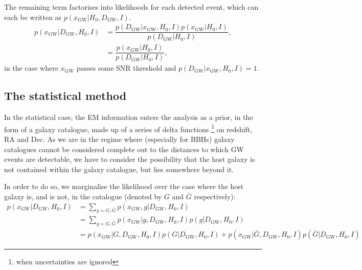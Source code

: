 \documentclass[a4paper,10pt]{article}
\begin{document}
The remaining term factorises into likelihoods for each detected event,
which can each be written as $p(x_{\text{GW}}|H_0,D_{\text{GW}},I)$.
\begin{equation}
\label{Eq.xD}
\begin{aligned}
p(x_{\text{GW}}|D_{\text{GW}},H_0,I) &= \dfrac{p(D_{\text{GW}}|x_{\text{GW}},H_0,I)p(x_{\text{GW}}|H_0,I)}{p(D_{\text{GW}}|H_0,I)},
\\ &= \dfrac{p(x_{\text{GW}}|H_0,I)}{p(D_{\text{GW}}|H_0,I)},
\end{aligned} 
\end{equation}
in the case where $x_{\text{GW}}$ passes some SNR threshold and $p(D_{\text{GW}}|x_{\text{GW}},H_0,I)=1$.

\subsection{The statistical method}
In the statistical case, the EM information enters the analysis as a prior, in the form of a galaxy catalogue, made up of a series of delta functions \footnote{when uncertainties are ignored} on redshift, RA and Dec.  As we are in the regime where (especially for BBHs) galaxy catalogues cannot be considered complete out to the distances to which GW events are detectable, we have to consider the possibility that the host galaxy is not contained within the galaxy catalogue, but lies somewhere beyond it.

In order to do so, we marginalise the likelihood over the case where the host galaxy is, and is not, in the catalogue (denoted by $G$ and $\bar{G}$ respectively):
\begin{equation} \label{Eq:sum G}
\begin{aligned}
p(x_{\text{GW}}|D_{\text{GW}},H_0,I) &= \sum_{g=G,\bar{G}} p(x_{\text{GW}},g|D_{\text{GW}},H_0,I)
\\ &= \sum_{g=G,\bar{G}} p(x_{\text{GW}}|g,D_{\text{GW}},H_0,I) p(g|D_{\text{GW}},H_0,I)
\\ &= p(x_{\text{GW}}|G,D_{\text{GW}},H_0,I) p(G|D_{\text{GW}},H_0,I) + p(x_{\text{GW}}|\bar{G},D_{\text{GW}},H_0,I) p(\bar{G}|D_{\text{GW}},H_0,I)
\end{aligned} 
\end{equation}
\end{document}
